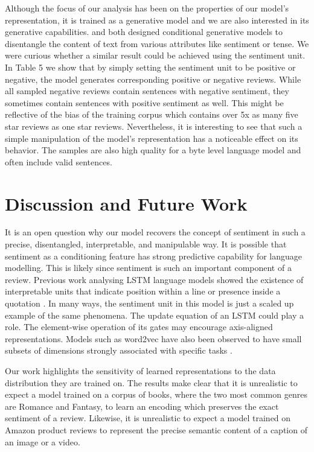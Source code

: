 Although the focus of our analysis has been on the properties of our model's representation, it is trained as a generative model and we are also interested in its generative capabilities. \citet{hu2017controllable} and \citet{dong2017learning} both designed conditional generative models to disentangle the content of text from various attributes like sentiment or tense. We were curious whether a similar result could be achieved using the sentiment unit. In Table 5 we show that by simply setting the sentiment unit to be positive or negative, the model generates corresponding positive or negative reviews. While all sampled negative reviews contain sentences with negative sentiment, they sometimes contain sentences with positive sentiment as well. This might be reflective of the bias of the training corpus which contains over 5x as many five star reviews as one star reviews. Nevertheless, it is interesting to see that such a simple manipulation of the model's representation has a noticeable effect on its behavior. The samples are also high quality for a byte level language model and often include valid sentences.

\section{Discussion and Future Work} It is an open question why our model recovers the concept of sentiment in such a precise, disentangled, interpretable, and manipulable way. It is possible that sentiment as a conditioning feature has strong predictive capability for language modelling. This is likely since sentiment is such an important component of a review. Previous work analysing LSTM language models showed the existence of interpretable units that indicate position within a line or presence inside a quotation \cite{karpathy2015visualizing}. In many ways, the sentiment unit in this model is just a scaled up example of the same phenomena. The update equation of an LSTM could play a role. The element-wise operation of its gates may encourage axis-aligned representations. Models such as word2vec have also been observed to have small subsets of dimensions strongly associated with specific tasks \cite{li2016understanding}. 

Our work highlights the sensitivity of learned representations to the data distribution they are trained on. The results make clear that it is unrealistic to expect a model trained on a corpus of books, where the two most common genres are Romance and Fantasy, to learn an encoding which preserves the exact sentiment of a review. Likewise, it is unrealistic to expect a model trained on Amazon product reviews to represent the precise semantic content of a caption of an image or a video.

